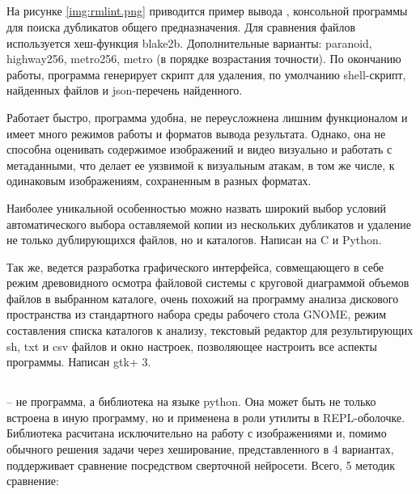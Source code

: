 \documentclass[variant=courcework]{bsuir}
\begin{document}
\subsection*{}

На рисунке \ref{img:rmlint.png} приводится пример вывода ,
консольной программы для поиска дубликатов общего предназначения. Для сравнения
файлов используется хеш-функция blake2b. Дополнительные варианты: paranoid,
highway256, metro256, metro (в порядке возрастания точности). По окончанию
работы, программа генерирует скрипт для удаления, по умолчанию shell-скрипт,
найденных файлов и json-перечень найденного.

Работает быстро, программа удобна, не переусложнена лишним функционалом и имеет
много режимов работы и форматов вывода результата. Однако, она не способна
оценивать содержимое изображений и видео визуально и работать с метаданными, что
делает ее уязвимой к визуальным атакам, в том же числе, к одинаковым
изображениям, сохраненным в разных форматах.


Наиболее уникальной особенностью можно назвать широкий выбор условий
автоматического выбора оставляемой копии из нескольких дубликатов и удаление не
только дублирующихся файлов, но и каталогов. Написан на C и Python.

Так же, ведется разработка графического интерфейса, совмещающего в себе режим
древовидного осмотра файловой системы с круговой диаграммой объемов файлов в
выбранном каталоге, очень похожий на программу анализа дискового пространства из
стандартного набора среды рабочего стола GNOME, режим составления списка
каталогов к анализу, текстовый редактор для результирующих sh, txt и csv файлов
и окно настроек, позволяющее настроить все аспекты программы. Написан gtk+ 3.


\subsection*{}

 -- не программа, а библиотека на языке python. Она может
быть не только встроена в иную программу, но и применена в роли утилиты в
REPL-оболочке. Библиотека расчитана исключительно на работу с изображениями и,
помимо обычного решения задачи через хеширование, представленного в 4 вариантах,
поддерживает сравнение посредством сверточной нейросети. Всего, 5 методик
сравнение:
\end{document}
